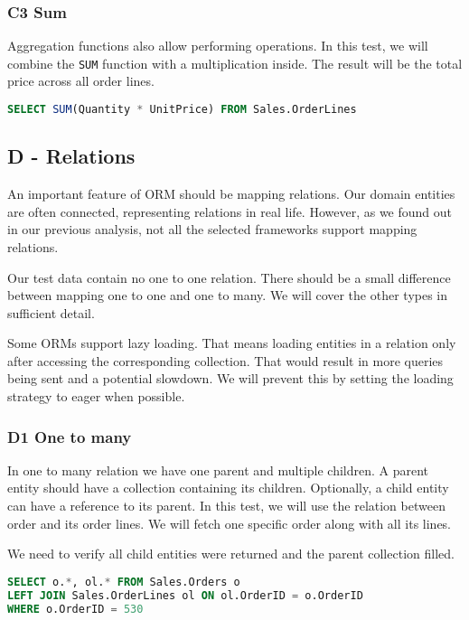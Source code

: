 \subsubsection*{C3 Sum} \label{query:c3}
Aggregation functions also allow performing operations. In this test, we will combine the \texttt{SUM} function with a multiplication inside. The result will be the total price across all order lines.
\begin{lstlisting}[language=SQL]
SELECT SUM(Quantity * UnitPrice) FROM Sales.OrderLines
\end{lstlisting}

\subsection{D - Relations}
An important feature of ORM should be mapping relations. Our domain entities are often connected, representing relations in real life.
However, as we found out in our previous analysis, not all the selected frameworks support mapping relations. 

Our test data contain no one to one relation. There should be a small difference between mapping one to one and one to many. We will cover the other types in sufficient detail.

Some ORMs support lazy loading. That means loading entities in a relation only after accessing the corresponding collection. That would result in more queries being sent and a potential slowdown.
We will prevent this by setting the loading strategy to eager when possible.

\subsubsection*{D1 One to many} \label{query:d1}
In one to many relation we have one parent and multiple children. A parent entity should have a collection containing its children. Optionally, a child entity can have a reference to its parent.
In this test, we will use the relation between order and its order lines. We will fetch one specific order along with all its lines.

We need to verify all child entities were returned and the parent collection filled. 



\begin{lstlisting}[language=SQL]
SELECT o.*, ol.* FROM Sales.Orders o
LEFT JOIN Sales.OrderLines ol ON ol.OrderID = o.OrderID
WHERE o.OrderID = 530
\end{lstlisting}

